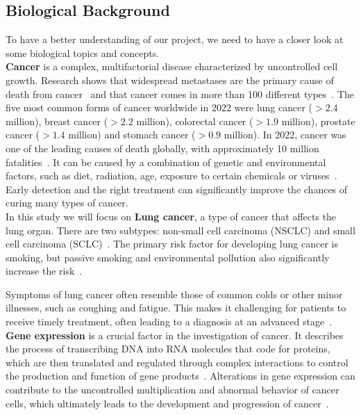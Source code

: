 \subsection{Biological Background} \label{subsec:biological_background}
To have a better understanding of our project, we need to have a closer look at some biological topics and concepts.\\

\textbf{Cancer} is a complex, multifactorial disease characterized by uncontrolled cell growth.
Research shows that widespread metastases are the primary cause of death from cancer~\cite{who_cancer_fact_sheet}
and that cancer comes in more than 100 different types~\cite{nci_cancer_types}.
The five most common forms of cancer worldwide in 2022 were lung cancer ($>2.4$ million),
breast cancer ($>2.2$ million), colorectal cancer ($>1.9$ million), prostate cancer ($>1.4$ million) and
stomach cancer ($>0.9$ million).
In 2022, cancer was one of the leading causes of death globally,
with approximately 10 million fatalities~\cite{ferlay2024global}.
It can be caused by a combination of genetic and environmental factors,
such as diet, radiation, age, exposure to certain chemicals or viruses~\cite{nci_cancer_risk}.
Early detection and the right treatment can significantly improve the chances of curing many types of cancer.
\\

In this study we will focus on \textbf{Lung cancer}, a type of cancer that affects the lung organ.
There are two subtypes: non-small cell carcinoma (NSCLC) and small cell carcinoma (SCLC)~\cite{nci_lung_cancer_types}.
The primary risk factor for developing lung cancer is smoking,
but passive smoking and environmental pollution also significantly increase the risk~\cite{nci_lung_cancer_types}.

Symptoms of lung cancer often resemble those of common colds or other minor illnesses, such as coughing and fatigue.
This makes it challenging for patients to receive timely treatment, often leading to a diagnosis at an advanced stage~\cite{who_lung_cancer}.
\\

\textbf{Gene expression} is a crucial factor in the investigation of cancer.
It describes the process of transcribing DNA into RNA molecules that code for proteins,
which are then translated and regulated through complex interactions to control the production
and function of gene products~\cite{nhi_gene_expression}.
Alterations in gene expression can contribute to the uncontrolled multiplication and abnormal behavior of cancer cells,
which ultimately leads to the development and progression of cancer~\cite{ferlier2022regulation}.
\\

